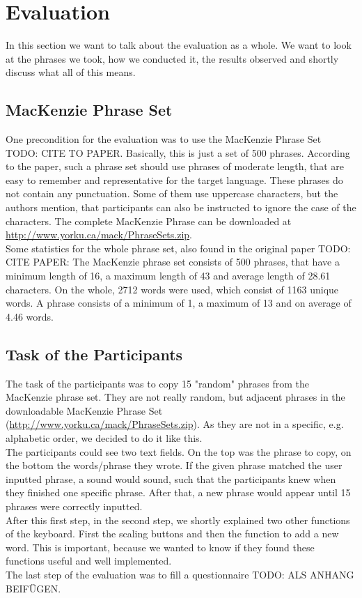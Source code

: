\chapter{Evaluation}

In this section we want to talk about the evaluation as a whole. We want to look at the phrases we took, how we conducted it, the results observed and shortly discuss what all of this means.

\section{MacKenzie Phrase Set}
One precondition for the evaluation was to use the MacKenzie Phrase Set TODO: CITE TO PAPER. Basically, this is just a set of 500 phrases. According to the paper, such a phrase set should use phrases of moderate length, that are easy to remember and representative for the target language. These phrases do not contain any punctuation. Some of them use uppercase characters, but the authors mention, that participants can also be instructed to ignore the case of the characters. The complete MacKenzie Phrase can be downloaded at \hyperlink{http://www.yorku.ca/mack/PhraseSets.zip}{http://www.yorku.ca/mack/PhraseSets.zip}.\\
Some statistics for the whole phrase set, also found in the original paper TODO: CITE PAPER: The MacKenzie phrase set consists of 500 phrases, that have a minimum length of 16, a maximum length of 43 and average length of 28.61 characters. On the whole, 2712 words were used, which consist of 1163 unique words. A phrase consists of a minimum of 1, a maximum of 13 and on average of 4.46 words.

\section{Task of the Participants}
The task of the participants was to copy 15 "random" phrases from the MacKenzie phrase set. They are not really random, but adjacent phrases in the downloadable MacKenzie Phrase Set (\hyperlink{http://www.yorku.ca/mack/PhraseSets.zip}{http://www.yorku.ca/mack/PhraseSets.zip}). As they are not in a specific, e.g. alphabetic order, we decided to do it like this.\\
The participants could see two text fields. On the top was the phrase to copy, on the bottom the words/phrase they wrote. If the given phrase matched the user inputted phrase, a sound would sound, such that the participants knew when they finished one specific phrase. After that, a new phrase would appear until 15 phrases were correctly inputted.\\
After this first step, in the second step, we shortly explained two other functions of the keyboard. First the scaling buttons and then the function to add a new word. This is important, because we wanted to know if they found these functions useful and well implemented.\\
The last step of the evaluation was to fill a questionnaire TODO: ALS ANHANG BEIFÜGEN.

